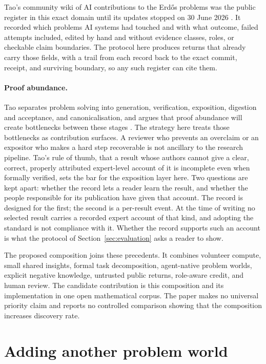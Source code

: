 \documentclass[10pt]{article}
\begin{document}
Tao's community wiki of AI contributions to the Erd\H{o}s problems was the
public register in this exact domain until its updates stopped on 30 June
2026 \cite{taowiki}.  It recorded which problems AI systems had touched and
with what outcome, failed attempts included, edited by hand and without
evidence classes, roles, or checkable claim boundaries.  The protocol here
produces returns that already carry those fields, with a trail from each
record back to the exact commit, receipt, and surviving boundary, so any such
register can cite them.

\paragraph{Proof abundance.}
Tao separates problem solving into generation, verification, exposition,
digestion and acceptance, and canonicalisation, and argues that proof
abundance will create bottlenecks between these stages \cite{tao2026}.  The
strategy here treats those bottlenecks as contribution surfaces.  A reviewer
who prevents an overclaim or an expositor who makes a hard step recoverable is
not ancillary to the research pipeline.  Tao's rule of thumb, that a result
whose authors cannot give a clear, correct, properly attributed expert-level
account of it is incomplete even when formally verified, sets the bar for the
exposition layer here.  Two questions are kept apart: whether the record lets a
reader learn the result, and whether the people responsible for its
publication have given that account.  The record is designed for the first;
the second is a per-result event.  At the time of writing no selected result
carries a recorded expert account of that kind, and adopting the standard is
not compliance with it.  Whether the record supports such an account is what
the protocol of Section~\ref{sec:evaluation} asks a reader to show.

The proposed composition joins these precedents.  It combines volunteer
compute, small shared insights, formal task decomposition, agent-native
problem worlds, explicit negative knowledge, untrusted public returns,
role-aware credit, and human review.  The candidate contribution is this
composition and its implementation in one open mathematical corpus.  The
paper makes no universal priority claim and reports no controlled comparison
showing that the composition increases discovery rate.

\section{Adding another problem world}\label{sec:add-problem}
\end{document}
